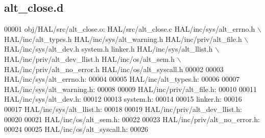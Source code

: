 \subsection{alt\+\_\+close.\+d}
\label{alt__close_8d_source}

\begin{DoxyCode}
00001 obj/HAL/src/alt\_close.o: HAL/src/alt\_close.c HAL/inc/sys/alt_errno.h \(\backslash\)
 HAL/inc/alt\_types.h HAL/inc/sys/alt\_warning.h HAL/inc/priv/alt\_file.h \(\backslash\)
 HAL/inc/sys/alt_dev.h system.h linker.h HAL/inc/sys/alt_llist.h \(\backslash\)
 HAL/inc/priv/alt_dev_llist.h HAL/inc/os/alt\_sem.h \(\backslash\)
 HAL/inc/priv/alt_no_error.h HAL/inc/os/alt\_syscall.h
00002 
00003 HAL/inc/sys/alt_errno.h:
00004 
00005 HAL/inc/alt\_types.h:
00006 
00007 HAL/inc/sys/alt\_warning.h:
00008 
00009 HAL/inc/priv/alt\_file.h:
00010 
00011 HAL/inc/sys/alt_dev.h:
00012 
00013 system.h:
00014 
00015 linker.h:
00016 
00017 HAL/inc/sys/alt_llist.h:
00018 
00019 HAL/inc/priv/alt_dev_llist.h:
00020 
00021 HAL/inc/os/alt\_sem.h:
00022 
00023 HAL/inc/priv/alt_no_error.h:
00024 
00025 HAL/inc/os/alt\_syscall.h:
00026 \end{DoxyCode}
